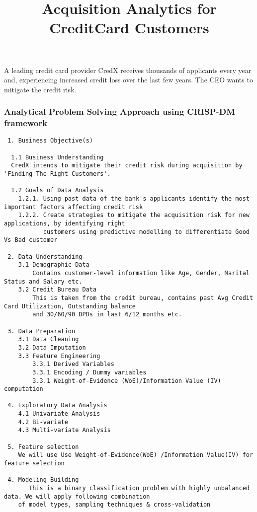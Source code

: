 \documentclass[]{article}
\title{Acquisition Analytics for CreditCard Customers}
\author{}
\date{}
\begin{document}
\maketitle

A leading credit card provider CredX receives thousands of applicants
every year and, experiencing increased credit loss over the last few
years. The CEO wants to mitigate the credit risk.

\subsubsection{Analytical Problem Solving Approach using CRISP-DM
framework}\label{analytical-problem-solving-approach-using-crisp-dm-framework}

\begin{verbatim}
 1. Business Objective(s)    

  1.1 Business Understanding
  CredX intends to mitigate their credit risk during acquisition by 'Finding The Right Customers'.
        
  1.2 Goals of Data Analysis
    1.2.1. Using past data of the bank's applicants identify the most important factors affecting credit risk
    1.2.2. Create strategies to mitigate the acquisition risk for new applications, by identifying right 
           customers using predictive modelling to differentiate Good Vs Bad customer

 2. Data Understanding
    3.1 Demographic Data
        Contains customer-level information like Age, Gender, Marital Status and Salary etc.
    3.2 Credit Bureau Data
        This is taken from the credit bureau, contains past Avg Credit Card Utilization, Outstanding balance 
        and 30/60/90 DPDs in last 6/12 months etc.

 3. Data Preparation
    3.1 Data Cleaning
    3.2 Data Imputation
    3.3 Feature Engineering
        3.3.1 Derived Variables
        3.3.1 Encoding / Dummy variables
        3.3.1 Weight-of-Evidence (WoE)/Information Value (IV) computation

 4. Exploratory Data Analysis
    4.1 Univariate Analysis
    4.2 Bi-variate 
    4.3 Multi-variate Analysis

 5. Feature selection
    We will use Use Weight-of-Evidence(WoE) /Information Value(IV) for feature selection

 4. Modeling Building       
       This is a binary classification problem with highly unbalanced data. We will apply following combination
    of model types, sampling techniques & cross-validation


\end{verbatim}
\end{document}
